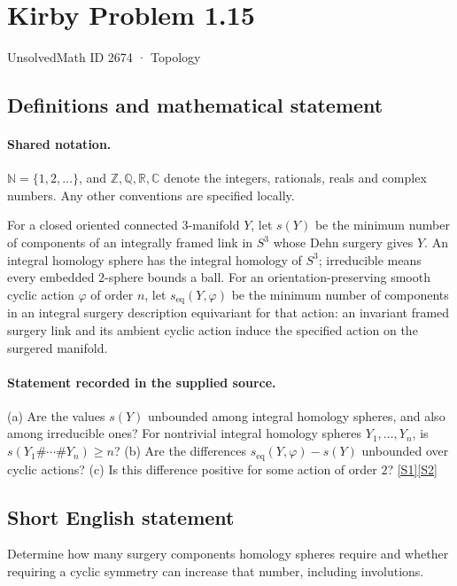 \documentclass[11pt]{article}
\newcommand{\sref}[2]{\hyperlink{source:#1:#2}{[S#2]}}
\begin{document}
\setcounter{section}{2673}
\section{Kirby Problem 1.15}\label{2674}
{\small\sffamily UnsolvedMath ID 2674 · Topology}
\subsection{Definitions and mathematical statement}

\paragraph{Shared notation.}$\mathbb N=\{1,2,\ldots\}$, and $\mathbb Z,\mathbb Q,\mathbb R,\mathbb C$ denote the integers, rationals, reals and complex numbers. Any other conventions are specified locally.


For a closed oriented connected $3$-manifold $Y$, let $s(Y)$ be the minimum number of components of an integrally framed link in $S^3$ whose Dehn surgery gives $Y$. An integral homology sphere has the integral homology of $S^3$; irreducible means every embedded $2$-sphere bounds a ball. For an orientation-preserving smooth cyclic action $\varphi$ of order $n$, let $s_{\mathrm{eq}}(Y,\varphi)$ be the minimum number of components in an integral surgery description equivariant for that action: an invariant framed surgery link and its ambient cyclic action induce the specified action on the surgered manifold.
\paragraph{Statement recorded in the supplied source.}
(a) Are the values $s(Y)$ unbounded among integral homology spheres, and also among irreducible ones? For nontrivial integral homology spheres $Y_1,\ldots,Y_n$, is $s(Y_1\#\cdots\#Y_n)\geq n$? (b) Are the differences $s_{\mathrm{eq}}(Y,\varphi)-s(Y)$ unbounded over cyclic actions? (c) Is this difference positive for some action of order $2$? \sref{2674}{1}\sref{2674}{2}
\subsection{Short English statement}
Determine how many surgery components homology spheres require and whether requiring a cyclic symmetry can increase that number, including involutions.
\end{document}
